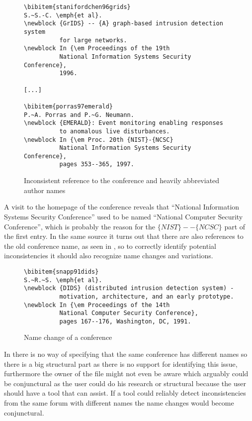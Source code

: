 \begin{figure}
  \centering
\begin{small}
\begin{verbatim}
\bibitem{stanifordchen96grids}
S.~S.-C. \emph{et al}.
\newblock {GrIDS} -- {A} graph-based intrusion detection system 
          for large networks.
\newblock In {\em Proceedings of the 19th
          National Information Systems Security Conference},
          1996.

[...]

\bibitem{porras97emerald}
P.~A. Porras and P.~G. Neumann.
\newblock {EMERALD}: Event monitoring enabling responses 
          to anomalous live disturbances.
\newblock In {\em Proc. 20th {NIST}-{NCSC}
          National Information Systems Security Conference},
          pages 353--365, 1997.

\end{verbatim}
\end{small}
  \caption{Inconsistent reference to the conference and heavily abbreviated author names}
\label{fig:entry_journal_name_authors}
\end{figure}

A visit to the homepage of the conference reveals that ``National
Information Systems Security Conference'' used to be named ``National
Computer Security Conference'', which is probably the reason for the
$\{NIST\}--\{NCSC\}$ part of the first entry\cite{nist2014_nissc}.  In
the same source it turns out that there are also references to the old
conference name, as seen in , so to
correctly identify potential inconsistencies it should also recognize
name changes and variations.

\begin{figure}
  \centering
\begin{small}
\begin{verbatim}
\bibitem{snapp91dids}
S.~R.~S. \emph{et al}.
\newblock {DIDS} (distributed intrusion detection system) -
          motivation, architecture, and an early prototype.
\newblock In {\em Proceedings of the 14th
          National Computer Security Conference},
          pages 167--176, Washington, DC, 1991.
\end{verbatim}
\end{small}
  \caption{Name change of a conference}
\label{fig:conference_name}
\end{figure}

In {\bibtex} there is no way of specifying that the same conference
has different names so there is a big structural part as there is no
support for identifying this issue, furthermore the owner of the
{\bibtex} file might not even be aware which arguably could be
conjunctural as the user could do his research or structural because
the user should have a tool that can assist.  If a tool could reliably
detect inconsistencies from the same forum with different names the
name changes would become conjunctural.


